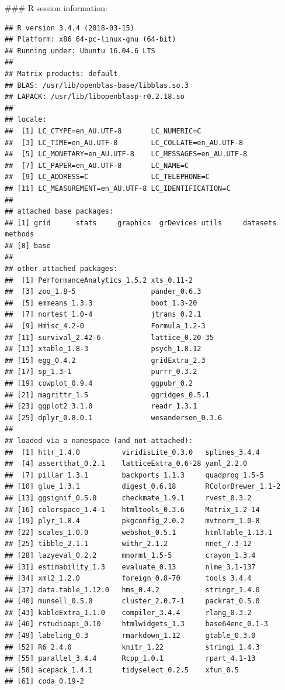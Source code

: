 \documentclass[]{article}
\newcommand{\blandscape}{\begin{landscape}}
\newcommand{\elandscape}{\end{landscape}}
\begin{document}
\blandscape
\elandscape
\#\#\# R session information:

\begin{verbatim}
## R version 3.4.4 (2018-03-15)
## Platform: x86_64-pc-linux-gnu (64-bit)
## Running under: Ubuntu 16.04.6 LTS
## 
## Matrix products: default
## BLAS: /usr/lib/openblas-base/libblas.so.3
## LAPACK: /usr/lib/libopenblasp-r0.2.18.so
## 
## locale:
##  [1] LC_CTYPE=en_AU.UTF-8       LC_NUMERIC=C              
##  [3] LC_TIME=en_AU.UTF-8        LC_COLLATE=en_AU.UTF-8    
##  [5] LC_MONETARY=en_AU.UTF-8    LC_MESSAGES=en_AU.UTF-8   
##  [7] LC_PAPER=en_AU.UTF-8       LC_NAME=C                 
##  [9] LC_ADDRESS=C               LC_TELEPHONE=C            
## [11] LC_MEASUREMENT=en_AU.UTF-8 LC_IDENTIFICATION=C       
## 
## attached base packages:
## [1] grid      stats     graphics  grDevices utils     datasets  methods  
## [8] base     
## 
## other attached packages:
##  [1] PerformanceAnalytics_1.5.2 xts_0.11-2                
##  [3] zoo_1.8-5                  pander_0.6.3              
##  [5] emmeans_1.3.3              boot_1.3-20               
##  [7] nortest_1.0-4              jtrans_0.2.1              
##  [9] Hmisc_4.2-0                Formula_1.2-3             
## [11] survival_2.42-6            lattice_0.20-35           
## [13] xtable_1.8-3               psych_1.8.12              
## [15] egg_0.4.2                  gridExtra_2.3             
## [17] sp_1.3-1                   purrr_0.3.2               
## [19] cowplot_0.9.4              ggpubr_0.2                
## [21] magrittr_1.5               ggridges_0.5.1            
## [23] ggplot2_3.1.0              readr_1.3.1               
## [25] dplyr_0.8.0.1              wesanderson_0.3.6         
## 
## loaded via a namespace (and not attached):
##  [1] httr_1.4.0          viridisLite_0.3.0   splines_3.4.4      
##  [4] assertthat_0.2.1    latticeExtra_0.6-28 yaml_2.2.0         
##  [7] pillar_1.3.1        backports_1.1.3     quadprog_1.5-5     
## [10] glue_1.3.1          digest_0.6.18       RColorBrewer_1.1-2 
## [13] ggsignif_0.5.0      checkmate_1.9.1     rvest_0.3.2        
## [16] colorspace_1.4-1    htmltools_0.3.6     Matrix_1.2-14      
## [19] plyr_1.8.4          pkgconfig_2.0.2     mvtnorm_1.0-8      
## [22] scales_1.0.0        webshot_0.5.1       htmlTable_1.13.1   
## [25] tibble_2.1.1        withr_2.1.2         nnet_7.3-12        
## [28] lazyeval_0.2.2      mnormt_1.5-5        crayon_1.3.4       
## [31] estimability_1.3    evaluate_0.13       nlme_3.1-137       
## [34] xml2_1.2.0          foreign_0.8-70      tools_3.4.4        
## [37] data.table_1.12.0   hms_0.4.2           stringr_1.4.0      
## [40] munsell_0.5.0       cluster_2.0.7-1     packrat_0.5.0      
## [43] kableExtra_1.1.0    compiler_3.4.4      rlang_0.3.2        
## [46] rstudioapi_0.10     htmlwidgets_1.3     base64enc_0.1-3    
## [49] labeling_0.3        rmarkdown_1.12      gtable_0.3.0       
## [52] R6_2.4.0            knitr_1.22          stringi_1.4.3      
## [55] parallel_3.4.4      Rcpp_1.0.1          rpart_4.1-13       
## [58] acepack_1.4.1       tidyselect_0.2.5    xfun_0.5           
## [61] coda_0.19-2
\end{verbatim}
\end{document}
